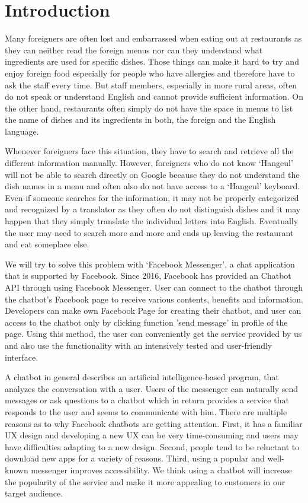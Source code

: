 \section{Introduction}
Many foreigners are often lost and embarrassed when eating out at restaurants as they can neither read the foreign menus nor can they understand what ingredients are used for specific dishes. Those things can make it hard to try and enjoy foreign food especially for people who have allergies and therefore have to ask the staff every time. But staff members, especially in more rural areas, often do not speak or understand English and cannot provide sufficient information. On the other hand, restaurants often simply do not have the space in menus to list the name of dishes and its ingredients in both, the foreign and the English language.

 Whenever foreigners face this situation, they have to search and retrieve all the different information manually. However, foreigners who do not know ‘Hangeul’ will not be able to search directly on Google because they do not understand the dish names in a menu and often also do not have access to a ‘Hangeul’ keyboard. Even if someone searches for the information, it may not be properly categorized and recognized by a translator as they often do not distinguish dishes and it may happen that they simply translate the individual letters into English. Eventually the user may need to search more and more and ends up leaving the restaurant and eat someplace else. 

 We will try to solve this problem with ‘Facebook Messenger’, a chat application that is supported by Facebook. Since 2016, Facebook has provided an Chatbot API through using Facebook Messenger. User can connect to the chatbot through the chatbot's Facebook page to receive various contents, benefits and information. Developers can make own Facebook Page for creating their chatbot, and user can access to the chatbot only by clicking function 'send message' in profile of the page. Using this method, the user can conveniently get the service provided by us and also use the functionality with an intensively tested and user-friendly interface.

 A chatbot in general describes an artificial intelligence-based program, that analyzes the conversation with a user. Users of the messenger can naturally send messages or ask questions to a chatbot which in return provides a service that responds to the user and seems to communicate with him. There are multiple reasons as to why Facebook chatbots are getting attention. First, it has a familiar UX design and developing a new UX can be very time-consuming and users may have difficulties adapting to a new design. Second, people tend to be reluctant to download new apps for a variety of reasons. Third, using a popular and well-known messenger improves accessibility. We think using a chatbot will increase the popularity of the service and make it more appealing to customers in our target audience. 

